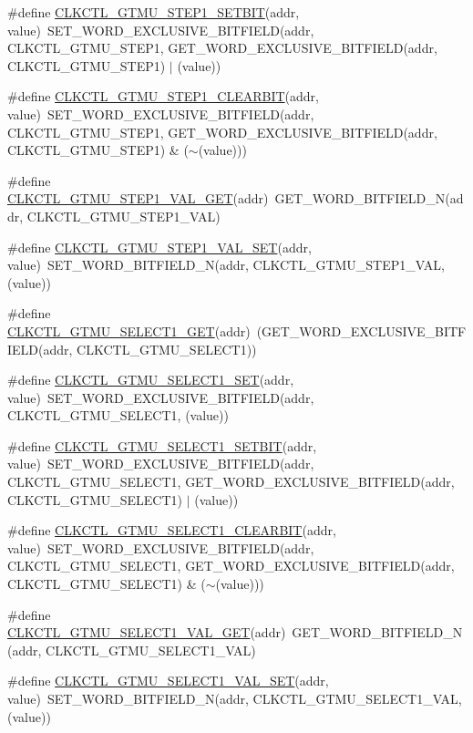 \begin{DoxyCompactItemize}
\#define \hyperlink{a00544_a96e2e15cff7500c4445f4f8d37bdb866}{CLKCTL\_\-GTMU\_\-STEP1\_\-SETBIT}(addr, value)~SET\_\-WORD\_\-EXCLUSIVE\_\-BITFIELD(addr, CLKCTL\_\-GTMU\_\-STEP1, GET\_\-WORD\_\-EXCLUSIVE\_\-BITFIELD(addr, CLKCTL\_\-GTMU\_\-STEP1) $|$ (value))
\item 
\#define \hyperlink{a00544_a6e36901c865c840ad54330bdb878f04b}{CLKCTL\_\-GTMU\_\-STEP1\_\-CLEARBIT}(addr, value)~SET\_\-WORD\_\-EXCLUSIVE\_\-BITFIELD(addr, CLKCTL\_\-GTMU\_\-STEP1, GET\_\-WORD\_\-EXCLUSIVE\_\-BITFIELD(addr, CLKCTL\_\-GTMU\_\-STEP1) \& ($\sim$(value)))
\item 
\#define \hyperlink{a00544_a02e33118ae0b9d34cddf80c2ce016eb4}{CLKCTL\_\-GTMU\_\-STEP1\_\-VAL\_\-GET}(addr)~GET\_\-WORD\_\-BITFIELD\_\-N(addr, CLKCTL\_\-GTMU\_\-STEP1\_\-VAL)
\item 
\#define \hyperlink{a00544_a90abbc7ede3a599f846013ac8a1efd43}{CLKCTL\_\-GTMU\_\-STEP1\_\-VAL\_\-SET}(addr, value)~SET\_\-WORD\_\-BITFIELD\_\-N(addr, CLKCTL\_\-GTMU\_\-STEP1\_\-VAL, (value))
\item 
\#define \hyperlink{a00544_a60ffa81cd917874b76925490dde9f219}{CLKCTL\_\-GTMU\_\-SELECT1\_\-GET}(addr)~(GET\_\-WORD\_\-EXCLUSIVE\_\-BITFIELD(addr, CLKCTL\_\-GTMU\_\-SELECT1))
\item 
\#define \hyperlink{a00544_a37318dc2449ed8a2bffb400db67a1353}{CLKCTL\_\-GTMU\_\-SELECT1\_\-SET}(addr, value)~SET\_\-WORD\_\-EXCLUSIVE\_\-BITFIELD(addr, CLKCTL\_\-GTMU\_\-SELECT1, (value))
\item 
\#define \hyperlink{a00544_a823aa16b0c0587f5ec22de8e95b082ab}{CLKCTL\_\-GTMU\_\-SELECT1\_\-SETBIT}(addr, value)~SET\_\-WORD\_\-EXCLUSIVE\_\-BITFIELD(addr, CLKCTL\_\-GTMU\_\-SELECT1, GET\_\-WORD\_\-EXCLUSIVE\_\-BITFIELD(addr, CLKCTL\_\-GTMU\_\-SELECT1) $|$ (value))
\item 
\#define \hyperlink{a00544_a758df1a4c7ccd8017fe303feb0c026da}{CLKCTL\_\-GTMU\_\-SELECT1\_\-CLEARBIT}(addr, value)~SET\_\-WORD\_\-EXCLUSIVE\_\-BITFIELD(addr, CLKCTL\_\-GTMU\_\-SELECT1, GET\_\-WORD\_\-EXCLUSIVE\_\-BITFIELD(addr, CLKCTL\_\-GTMU\_\-SELECT1) \& ($\sim$(value)))
\item 
\#define \hyperlink{a00544_a4b392978c9a2790610d234228ed6ad1b}{CLKCTL\_\-GTMU\_\-SELECT1\_\-VAL\_\-GET}(addr)~GET\_\-WORD\_\-BITFIELD\_\-N(addr, CLKCTL\_\-GTMU\_\-SELECT1\_\-VAL)
\item 
\#define \hyperlink{a00544_aca2f33104f6bde21a6a8569b11fa1c24}{CLKCTL\_\-GTMU\_\-SELECT1\_\-VAL\_\-SET}(addr, value)~SET\_\-WORD\_\-BITFIELD\_\-N(addr, CLKCTL\_\-GTMU\_\-SELECT1\_\-VAL, (value))
\item 

\end{DoxyCompactItemize}
